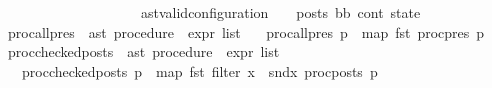 \begin{isabellebody}
\ \ \ \ \ \ \ \ \ \ \ \ \ \ \ \ \ \ \ \ ast{\isacharunderscore}{\kern0pt}valid{\isacharunderscore}{\kern0pt}configuration\ {\isasymLambda}\ {\isasymGamma}\ {\isasymOmega}\ posts\ bb\ cont\ state{\isacharparenright}{\kern0pt}{\isachardoublequoteclose}\isanewline
\isanewline
{}\isamarkupfalse%
\isanewline
\isanewline
\isanewline
{}\isamarkupfalse%
\ proc{\isacharunderscore}{\kern0pt}all{\isacharunderscore}{\kern0pt}pres\ {\isacharcolon}{\kern0pt}{\isacharcolon}{\kern0pt}\ {\isachardoublequoteopen}ast\ procedure\ {\isasymRightarrow}\ expr\ list{\isachardoublequoteclose}\isanewline
\ \ \ {\isachardoublequoteopen}proc{\isacharunderscore}{\kern0pt}all{\isacharunderscore}{\kern0pt}pres\ p\ {\isacharequal}{\kern0pt}\ map\ fst\ {\isacharparenleft}{\kern0pt}proc{\isacharunderscore}{\kern0pt}pres\ p{\isacharparenright}{\kern0pt}{\isachardoublequoteclose}\isanewline
\isanewline
{}\isamarkupfalse%
\ proc{\isacharunderscore}{\kern0pt}checked{\isacharunderscore}{\kern0pt}posts\ {\isacharcolon}{\kern0pt}{\isacharcolon}{\kern0pt}\ {\isachardoublequoteopen}ast\ procedure\ {\isasymRightarrow}\ expr\ list{\isachardoublequoteclose}\isanewline
\ \ \ {\isachardoublequoteopen}proc{\isacharunderscore}{\kern0pt}checked{\isacharunderscore}{\kern0pt}posts\ p\ {\isacharequal}{\kern0pt}\ map\ fst\ {\isacharparenleft}{\kern0pt}filter\ {\isacharparenleft}{\kern0pt}{\isasymlambda}x{\isachardot}{\kern0pt}\ {\isasymnot}\ snd{\isacharparenleft}{\kern0pt}x{\isacharparenright}{\kern0pt}{\isacharparenright}{\kern0pt}\ {\isacharparenleft}{\kern0pt}proc{\isacharunderscore}{\kern0pt}posts\ p{\isacharparenright}{\kern0pt}{\isacharparenright}{\kern0pt}{\isachardoublequoteclose}\isanewline
\isanewline
%
\isadelimtheory
\isanewline
%
\endisadelimtheory
%
\isatagtheory
{}\isamarkupfalse%
%
\endisatagtheory
{\isafoldtheory}%
%
\isadelimtheory
%
\endisadelimtheory
%
\end{isabellebody}%
\endinput
